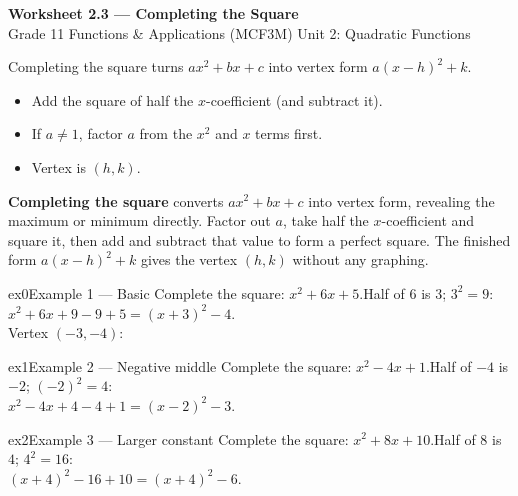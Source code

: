 \documentclass[11pt]{article}
\begin{document}
\begin{center}
{\LARGE\bfseries\color{titleblue}Worksheet 2.3 --- Completing the Square}\\[2pt]
{\small Grade 11 Functions \& Applications (MCF3M) \textperiodcentered{} Unit 2: Quadratic Functions}
\end{center}

\begin{ideabox}
Completing the square turns $ax^2+bx+c$ into vertex form $a(x-h)^2+k$.
\begin{itemize}[leftmargin=*,itemsep=2pt]
  \item Add the square of half the $x$-coefficient (and subtract it).
  \item If $a\ne1$, factor $a$ from the $x^2$ and $x$ terms first.
  \item Vertex is $(h,k)$.
\end{itemize}
\end{ideabox}

\begin{learnbox}
\textbf{Completing the square} converts $ax^2+bx+c$ into vertex form, revealing the maximum or minimum directly.
Factor out $a$, take half the $x$-coefficient and square it, then add and subtract that value to form a perfect square.
The finished form $a(x-h)^2+k$ gives the vertex $(h,k)$ without any graphing.
\end{learnbox}


\begin{example}{ex0}{Example 1 --- Basic}
Complete the square: $x^2+6x+5$.\soln Half of $6$ is $3$; $3^2=9$: \\ $x^2+6x+9-9+5=(x+3)^2-4$. \\ Vertex $(-3,-4)$:
\end{example}

\begin{example}{ex1}{Example 2 --- Negative middle}
Complete the square: $x^2-4x+1$.\soln Half of $-4$ is $-2$; $(-2)^2=4$: \\ $x^2-4x+4-4+1=(x-2)^2-3$.
\end{example}

\begin{example}{ex2}{Example 3 --- Larger constant}
Complete the square: $x^2+8x+10$.\soln Half of $8$ is $4$; $4^2=16$: \\ $(x+4)^2-16+10=(x+4)^2-6$.
\end{example}
\end{document}

